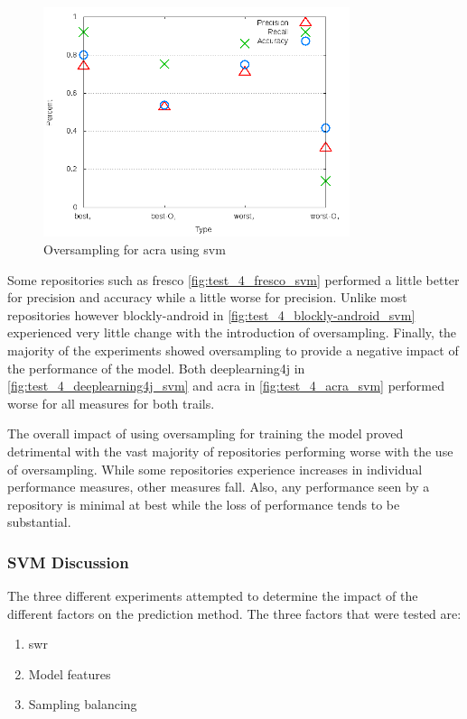 \begin{figure}[!ht]
    \centering

        \includegraphics[width=0.8\textwidth]{images/svm/test_4/acra_sample_range}
        \caption{Oversampling for acra using \gls{svm}}
        \label{fig:test_4_acra_svm}
\end{figure}


Some repositories such as fresco \autoref{fig:test_4_fresco_svm} performed a little better for precision and accuracy while a little worse for precision. Unlike most repositories however blockly-android in \autoref{fig:test_4_blockly-android_svm} experienced very little change with the introduction of oversampling. Finally, the majority of the experiments showed oversampling to provide a negative impact of the performance of the model. Both deeplearning4j in \autoref{fig:test_4_deeplearning4j_svm} and acra in \autoref{fig:test_4_acra_svm} performed worse for all measures for both trails.

The overall impact of using oversampling for training the model proved detrimental with the vast majority of repositories performing worse with the use of oversampling. While some repositories experience increases in individual performance measures, other measures fall. Also, any performance seen by a repository is minimal at best while the loss of performance tends to be substantial.

\subsubsection{SVM Discussion}
\label{subsec:svm_discussion}

The three different experiments attempted to determine the impact of the different factors on the prediction method. The three factors that were tested are:
\begin{enumerate}
\item \gls{swr}
\item Model features
\item Sampling balancing
\end{enumerate}


